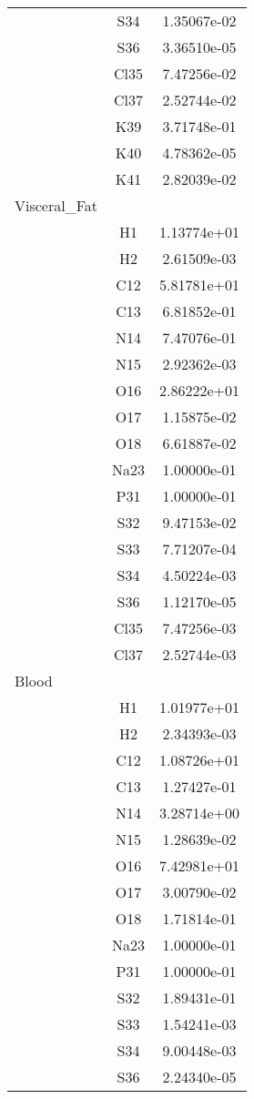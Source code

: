 \begin{centering}
\begin{longtable}{l c c}
& S34 & 1.35067e-02 \\ 
& S36 & 3.36510e-05 \\ 
& Cl35 & 7.47256e-02 \\ 
& Cl37 & 2.52744e-02 \\ 
& K39 & 3.71748e-01 \\ 
& K40 & 4.78362e-05 \\ 
& K41 & 2.82039e-02 \\ 
\hline
Visceral_Fat & & \\
\hline
& H1 & 1.13774e+01 \\ 
& H2 & 2.61509e-03 \\ 
& C12 & 5.81781e+01 \\ 
& C13 & 6.81852e-01 \\ 
& N14 & 7.47076e-01 \\ 
& N15 & 2.92362e-03 \\ 
& O16 & 2.86222e+01 \\ 
& O17 & 1.15875e-02 \\ 
& O18 & 6.61887e-02 \\ 
& Na23 & 1.00000e-01 \\ 
& P31 & 1.00000e-01 \\ 
& S32 & 9.47153e-02 \\ 
& S33 & 7.71207e-04 \\ 
& S34 & 4.50224e-03 \\ 
& S36 & 1.12170e-05 \\ 
& Cl35 & 7.47256e-03 \\ 
& Cl37 & 2.52744e-03 \\ 
\hline
Blood & & \\
\hline
& H1 & 1.01977e+01 \\ 
& H2 & 2.34393e-03 \\ 
& C12 & 1.08726e+01 \\ 
& C13 & 1.27427e-01 \\ 
& N14 & 3.28714e+00 \\ 
& N15 & 1.28639e-02 \\ 
& O16 & 7.42981e+01 \\ 
& O17 & 3.00790e-02 \\ 
& O18 & 1.71814e-01 \\ 
& Na23 & 1.00000e-01 \\ 
& P31 & 1.00000e-01 \\ 
& S32 & 1.89431e-01 \\ 
& S33 & 1.54241e-03 \\ 
& S34 & 9.00448e-03 \\ 
& S36 & 2.24340e-05 \\ 

\end{longtable}
\end{centering}

